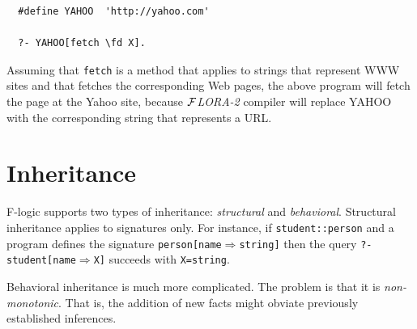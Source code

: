 \documentclass[11pt]{article}
\newcommand{\fd}{\ensuremath{{\rightarrow}}}                   %
\newcommand{\Fd}{\ensuremath{{\Rightarrow}}}                      %
\newcommand{\FLORA}{{\mbox{${\cal F}${\small\it LORA}\rm\emph{-2}}}\xspace}
\newcommand{\fl}{\mbox{F-logic}\xspace}
\begin{document}
\begin{verbatim}
  #define YAHOO  'http://yahoo.com'  

  ?- YAHOO[fetch \fd X].
\end{verbatim}
\noindent
Assuming that {\tt fetch} is a method that applies to strings that
represent WWW sites and that fetches the corresponding Web pages, the above
program will fetch the page at the Yahoo site, because \FLORA compiler will
replace YAHOO with the corresponding string that represents a URL.


\section{Inheritance}\label{sec-inheritance}


\fl supports two types of inheritance: \emph{structural} and
\emph{behavioral}.  Structural inheritance applies to signatures only. For
instance, if {\tt student::person} and a program defines the signature
{\tt person[name{\Fd}string]} then the query {\tt ?- student[name{\Fd}X]}
succeeds with {\tt X=string}.

Behavioral inheritance is much more complicated. The problem  is that it is
\emph{non-monotonic}. That is, the addition of new facts might obviate previously
established inferences.
\end{document}
